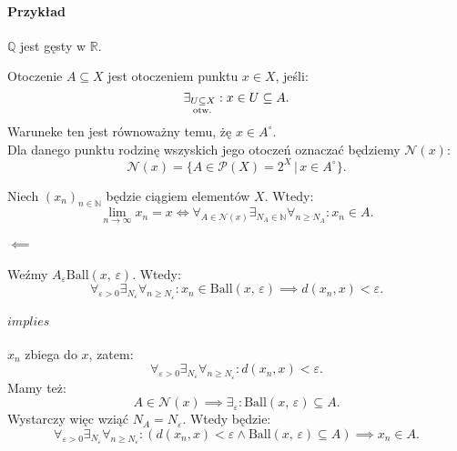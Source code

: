 \documentclass{article}
\numberwithin{defi}{section}
\numberwithin{defi}{section}
\newcommand{\R}{\mathbb{R}}
\newcommand{\N}{\mathbb{N}}
\newcommand{\Q}{\mathbb{Q}}
\newcommand{\oo}{\infty}
\newcommand{\Nau}{\mathcal{N}}
\newcommand{\subotw}{\underset{\clap{\scriptsize otw.}}{\subseteq}}
\newcommand{\dg}{^{\circ}}
\providecommand{\eps}{\varepsilon}
\providecommand{\dg}{^\circ}
\newcommand{\ciag}[1]{(#1_{n})_{n \in \N}}
\newcommand{\ball}[2]{\text{Ball}(#1, \, #2)}
\begin{document}
\paragraph*{Przykład} $\Q$ jest gęsty w $\R$.

\begin{defr}{Otoczenie}
    $A \subseteq X$ jest otoczeniem punktu $x \in X$, jeśli: \begin{equation}
        \exists_{U \subotw X}: x \in U \subseteq A.
    \end{equation} Waruneke ten jest równoważny temu, żę $x \in A \dg$. \\
    Dla danego punktu rodzinę wszyskich jego otoczeń oznaczać będziemy $\Nau (x)$: \begin{equation}
        \Nau (x) = \{ A \in \mathcal{P}(X) = 2^X \, \big| \, x \in A\dg \}.
    \end{equation}
\end{defr}

\begin{twier}{}
    Niech $\ciag{x}$ będzie ciągiem elementów $X$. Wtedy:\begin{equation}
        \lim_{n \to \oo} x_n = x \iff \forall_{A \in \Nau(x)} \exists_{N_A \in \N} \forall_{n \geqslant N_A}: x_n \in A.
    \end{equation}
\end{twier}

\begin{dow}
    \paragraph{$\impliedby$} Weźmy $A_\eps  \ball{x}{\eps}$. Wtedy:\begin{equation}
        \forall_{\eps >0} \exists_{N_\eps} \forall_{n \geqslant N_\eps}: x_n \in \ball{x}{\eps} \implies d(x_n, x) < \eps.
    \end{equation}
    \paragraph{$implies$} $x_n$ zbiega do $x$, zatem: \begin{equation*}
        \forall_{\eps >0} \exists_{N_\eps} \forall_{n \geqslant N_\eps}: d(x_n, x) < \eps.
    \end{equation*} Mamy też: \begin{equation*}
        A \in \Nau(x) \implies \exists_\eps: \ball{x}{\eps} \subseteq A.
    \end{equation*} Wystarczy więc wziąć $N_A = N_\eps$. Wtedy będzie: \begin{equation}
        \forall_{\eps >0} \exists_{N_\eps} \forall_{n \geqslant N_\eps}: (d(x_n, x) < \eps \wedge \ball{x}{\eps} \subseteq A) \implies x_n \in A.
    \end{equation}
\end{dow}
\end{document}
